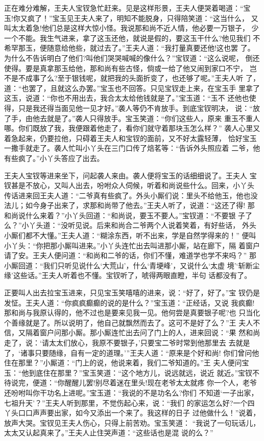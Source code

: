 正在难分难解，王夫人宝钗急忙赶来。见是这样形景，王夫人便哭着喝道：“宝
玉!你又疯了！”宝玉见王夫人来了，明知不能脱身，只得陪笑道：“这当什么，
又叫太太着急!他们总是这样大惊小怪。我说那和尚不近人情，他必要一万银子，
少一个不能。我生气进来，拿了这玉还他，就说是假的，要这玉干什么?他见我们
不希罕那玉，便随意给他些，就过去了。”王夫人道：“我打量真要还他!这也罢
了。为什么不告诉明白了他们?叫他们哭哭喊喊的像什么？”宝钗道：“这么说呢，
倒还使得。要是真拿那玉给他，那和尚有些古怪，倘或一给了他又闹到家口不宁，
岂不是不成事了么?至于银钱呢，就把我的头面折变了，也还够了呢。”王夫人听
了，道：“也罢了，且就这么办罢。”宝玉也不回答。只见宝钗走上来，在宝玉手
里拿了这玉，说道：“你也不用出去，我合太太给他钱就是了。”宝玉道：“玉不
还他也使得，只是我还得当面见他一见才好。”袭人等仍不肯放手。到底宝钗明决，
说：“放了手，由他去就是了。”袭人只得放手。宝玉笑道：“你们这些人，原来
重玉不重人哪。你们既放了我，我便跟着他走了，看你们就守着那块玉怎么样？”
袭人心里又着急起来，仍要拉他，只碍着王夫人和宝钗的面前，又不好太露轻薄，
恰好宝玉一撒手就走了。袭人忙叫小丫头在三门口传了焙茗等：“告诉外头照应着
二爷，他有些疯了。”小丫头答应了出去。

王夫人宝钗等进来坐下，问起袭人来由。袭人便将宝玉的话细细说了。王夫人
宝钗甚是不放心，又叫人出去，吩咐众人伺候，听着和尚说些什么。回来，小丫头
传话进来回王夫人道：“二爷真有些疯了。外头小厮们说：里头不给他玉，他也没
法儿；如今身子出来了，求那和尚带了他去。”王夫人听了，说道：“这还了得!
那和尚说什么来着？”小丫头回道：“和尚说，要玉不要人。”宝钗道：“不要银
子了么？”小丫头道：“没听见说。后来和尚合二爷两个人说着笑着，有好些话，
外头小厮们都不大懂。”王夫人道：“糊涂东西，听不出来，学是自然学得来的！”
便叫小丫头：“你把那小厮叫进来。”小丫头连忙出去叫进那小厮，站在廊下，隔
着窗户请了安。王夫人便问道：“和尚和二爷的话，你们不懂，难道学也学不来吗？”
那小厮回道：“我们只听见说什么‘大荒山’，什么‘青埂峰’，又说什么‘太虚
境’‘斩断尘缘’这些话。”王夫人听着也不懂。宝钗听了，唬得两眼直瞪，半句
话都没有了。

正要叫人出去拉宝玉进来，只见宝玉笑嘻嘻的进来，说：“好了，好了。”宝
钗仍是发怔。王夫人道：“你疯疯癫癫的说的是什么？”宝玉道：“正经话，又说
我疯癫!那和尚与我原认得的，他不过也是要来见我一见。他何尝是真要银子呢?也
只当化个善缘就是了。所以说明了，他自己就飘然而去了。这可不是好了么？”王
夫人不信，又隔着窗户问那小厮。那小厮连忙出去问了门上的人，进来回说：“果
然和尚走了，说：‘请太太们放心，我原不要银子，’只要宝二爷时常到他那里去
去就是了，‘诸事只要随缘，自有一定的道理。’”王夫人道：“原来是个好和尚!
你们曾问他住在那里？”小厮道：“门上的说，他说来着，我们二爷知道的。”王
夫人便问宝玉：“他到底住在那里？”宝玉笑道：“这个地方儿，说远就远，说近
就近。”宝钗不待说完，便道：“你醒醒儿罢!别尽着迷在里头!现在老爷太太就疼
你一个人，老爷还吩咐叫你干功名上进呢。”宝玉道：“我说的不是功名么?你们
不知道‘一子出家，七祖升天’？”王夫人听到那里，不觉伤起心来，说：“我们
的家运怎么好?一个四丫头口口声声要出家，如今又添出一个来了。我这样的日子
过他做什么！”说着，放声大哭。宝钗见王夫人伤心，只得上前苦劝。宝玉笑道：
“我说了一句玩话儿，太太又认起真来了。”王夫人止住哭声道：“这些话也是混
说的么？”

